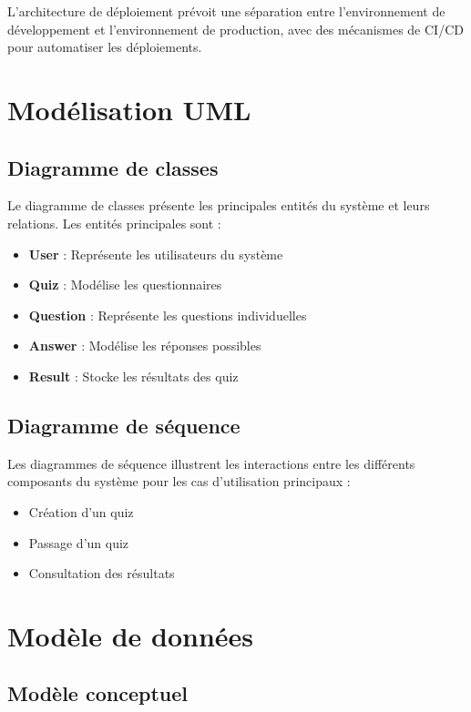 \documentclass[12pt,a4paper]{report}
\begin{document}
L'architecture de déploiement prévoit une séparation entre l'environnement de développement et l'environnement de production, avec des mécanismes de CI/CD pour automatiser les déploiements.

\section{Modélisation UML}

\subsection{Diagramme de classes}

Le diagramme de classes présente les principales entités du système et leurs relations. Les entités principales sont :

\begin{itemize}
    \item \textbf{User} : Représente les utilisateurs du système
    \item \textbf{Quiz} : Modélise les questionnaires
    \item \textbf{Question} : Représente les questions individuelles
    \item \textbf{Answer} : Modélise les réponses possibles
    \item \textbf{Result} : Stocke les résultats des quiz
\end{itemize}

\subsection{Diagramme de séquence}

Les diagrammes de séquence illustrent les interactions entre les différents composants du système pour les cas d'utilisation principaux :

\begin{itemize}
    \item Création d'un quiz
    \item Passage d'un quiz
    \item Consultation des résultats
\end{itemize}

\section{Modèle de données}

\subsection{Modèle conceptuel}
\end{document}
